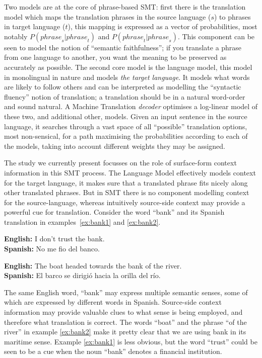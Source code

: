 \documentclass[smallextended]{svjour3}       %
\theoremstyle{break}
\begin{document}
Two models are at the core of phrase-based SMT: first there is the translation
model which maps the translation phrases in the source language ($s$) to
phrases in target language ($t$), this mapping is expressed as a vector of
probabilities, most notably $P({phrase}_s|{phrase}_t)$ and
$P({phrase}_t|{phrase}_s)$. This component can be seen to model the notion of
``semantic faithfulness''; if you translate a phrase from one language to
another, you want the meaning to be preserved as accurately as possible. The
second core model is the language model, this model in monolingual in nature
and models \emph{the target language}. It models what words are likely to
follow others and can be interpreted as modelling the ``syntactic fluency''
notion of translation; a translation should be in a natural word-order and
sound natural. A Machine Translation \emph{decoder} optimises a log-linear
model of these two, and additional other, models. Given an input sentence in
the source language, it searches through a vast space of all ``possible''
translation options, most non-sensical, for a path maximising the probabilities
according to each of the models, taking into account different weights they may
be assigned.

The study we currently present focusses on the role of surface-form context
information in this SMT process. The Language Model effectively models context
for the target language, it makes sure that a translated phrase fits nicely
along other translated phrases. But in SMT there is no component modelling
context for the source-language, whereas intuitively source-side context may
provide a powerful cue for translation. Consider the word ``bank'' and its
Spanish translation in examples~\ref{ex:bank1} and \ref{ex:bank2}.

\begin{exe} %
\ex \textbf{English:} I don't trust the bank. \\
    \textbf{Spanish:} No me fio del banco.
\label{ex:bank1}

\ex \textbf{English:} The boat headed towards the bank of the river. \\
    \textbf{Spanish:} El barco se dirigió hacia la orilla del río.
\label{ex:bank2}
\end{exe}

The same English word, ``bank'' may express multiple semantic senses, some of
which are expressed by different words in Spanish. Source-side context
information may provide valuable clues to what sense is being employed, and
therefore what translation is correct.  The words ``boat'' and the phrase ``of
the river'' in example \ref{ex:bank2} make it pretty clear that we are using
bank in its maritime sense. Example \ref{ex:bank1} is less obvious, but the
word ``trust'' could be seen to be a cue when the noun ``bank'' denotes a
financial institution.
\end{document}
